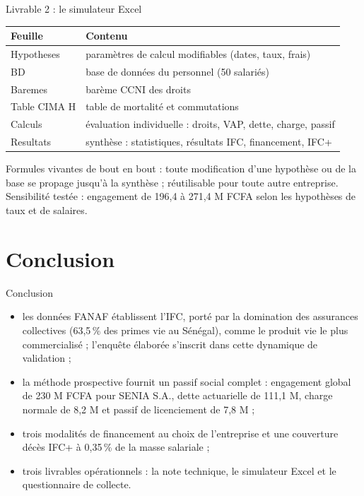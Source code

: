 \documentclass[aspectratio=169,11pt]{beamer}
\begin{document}
\begin{frame}{Livrable 2 : le simulateur Excel}
  \vspace{0.2cm}
  \begin{tabular}{ll}
    \toprule
    \rowcolor{orangeM} Feuille & Contenu \\
    \midrule
    Hypotheses & paramètres de calcul modifiables (dates, taux, frais) \\
    BD & base de données du personnel (50 salariés) \\
    Baremes & barème CCNI des droits \\
    Table CIMA H & table de mortalité et commutations \\
    Calculs & évaluation individuelle : droits, VAP, dette, charge, passif \\
    Resultats & synthèse : statistiques, résultats IFC, financement, IFC+ \\
    \bottomrule
  \end{tabular}
  \vspace{0.3cm}

  \small Formules vivantes de bout en bout : toute modification d'une hypothèse
  ou de la base se propage jusqu'à la synthèse ; réutilisable pour toute autre
  entreprise. Sensibilité testée : engagement de 196,4 à 271,4 M FCFA selon les
  hypothèses de taux et de salaires.
\end{frame}

\section{Conclusion}

\begin{frame}{Conclusion}
  \vspace{0.3cm}
  \begin{itemize}\itemsep0.3cm
    \item les données FANAF établissent l'IFC, porté par la domination des
          assurances collectives (63,5\,\% des primes vie au Sénégal), comme
          le produit vie le plus commercialisé ; l'enquête élaborée s'inscrit
          dans cette dynamique de validation ;
    \item la méthode prospective fournit un passif social complet : engagement
          global de 230 M FCFA pour SENIA S.A., dette actuarielle de 111,1 M,
          charge normale de 8,2 M et passif de licenciement de 7,8 M ;
    \item trois modalités de financement au choix de l'entreprise et une
          couverture décès IFC+ à 0,35\,\% de la masse salariale ;
    \item trois livrables opérationnels : la note technique, le simulateur
          Excel et le questionnaire de collecte.
  \end{itemize}
\end{frame}
\end{document}
